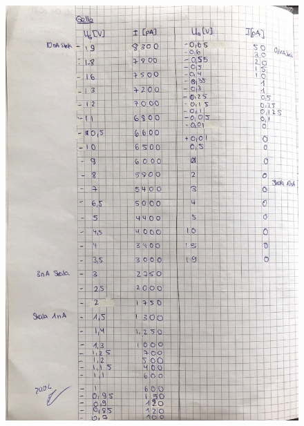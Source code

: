 \begin{figure}
    \centering
    \includegraphics[width=\textwidth]{content/photogelb.pdf}
\end{figure}